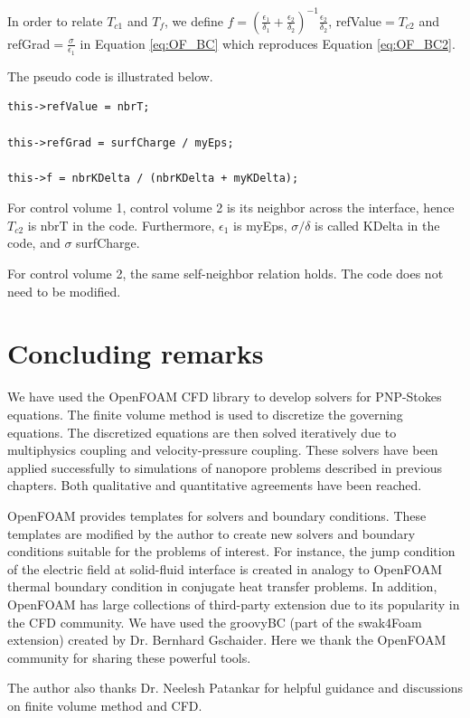 In order to relate $T_{c1}$ and $T_f$, we define $f = \left(\frac{\epsilon_1}{\delta_1}+\frac{\epsilon_2}{\delta_2}\right)^{-1}\frac{\epsilon_2}{\delta_2}$, \textsf{refValue}$=T_{c2}$ and \textsf{refGrad}$=\frac{\sigma}{\epsilon_1}$ in Equation \ref{eq:OF_BC} which reproduces Equation \ref{eq:OF_BC2}. 

The pseudo code is illustrated below.

\begin{lstlisting}
this->refValue = nbrT;

this->refGrad = surfCharge / myEps;

this->f = nbrKDelta / (nbrKDelta + myKDelta);
\end{lstlisting}
For control volume 1, control volume 2 is its neighbor across the interface, hence $T_{c2}$ is \textsf{nbrT} in the code. 
Furthermore, $\epsilon_1$ is \textsf{myEps}, $\sigma/\delta$ is called \textsf{KDelta} in the code, and $\sigma$ \textsf{surfCharge}.

For control volume 2, the same self-neighbor relation holds. The code does not need to be modified.

\section{Concluding remarks}
We have used the OpenFOAM CFD library to develop solvers for PNP-Stokes equations. The finite volume method is used to discretize the governing equations. The discretized equations are then solved iteratively due to multiphysics coupling and velocity-pressure coupling. These solvers have been applied successfully to simulations of nanopore problems described in previous chapters. Both qualitative and quantitative agreements have been reached.

OpenFOAM provides templates for solvers and boundary conditions. These templates are modified by the author to create new solvers and boundary conditions suitable for the problems of interest. For instance, the jump condition of the electric field at solid-fluid interface is created in analogy to OpenFOAM thermal boundary condition in conjugate heat transfer problems. In addition, OpenFOAM has large collections of third-party extension due to its popularity in the CFD community. We have used the \textsf{groovyBC} (part of the \textsf{swak4Foam} extension) created by Dr. Bernhard Gschaider. Here we thank the OpenFOAM community for sharing these powerful tools. 

The author also thanks Dr. Neelesh Patankar for helpful guidance and discussions on finite volume method and CFD.
